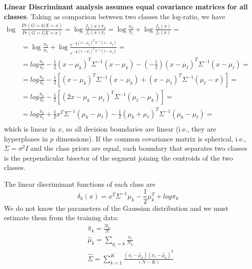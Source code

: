 \documentclass[12pt, letterpaper]{article}
\theoremstyle{definition}
\begin{document}
\textbf{Linear Discriminant analysis assumes equal covariance matrices for all classes}. Taking as comparison between two classes the log-ratio, we have
\begin{equation}
\begin{aligned}
\log &\frac{Pr(G=k|X=x)}{Pr(G=l|X=x)} = \log \frac{f_k(x) \pi_k}{f_\ell(x) \pi_\ell} = \log \frac{ \pi_k}{ \pi_\ell} + \log\frac{f_k(x)}{f_\ell(x) } =\\
&= \log \frac{ \pi_k}{ \pi_\ell} + \log\frac{e^{-\frac{1}{2}\left( x-\mu_k\right)^T\Sigma^{-1}\left( x-\mu_k\right)}}{e^{-\frac{1}{2}\left( x-\mu_\ell\right)^T\Sigma^{-1}\left( x-\mu_\ell\right)} }   =  \\
&=log \frac{ \pi_k}{ \pi_\ell} - \frac{1}{2}\left( x-\mu_k\right)^T\Sigma^{-1}\left( x-\mu_k\right) - \left( -\frac{1}{2}\right)\left( x-\mu_\ell\right)^T\Sigma^{-1}\left( x-\mu_\ell\right) =\\
&= log \frac{ \pi_k}{ \pi_\ell} - \frac{1}{2}\left[\left( x-\mu_k\right)^T\Sigma^{-1}\left( x-\mu_k\right) + \left( x-\mu_\ell\right)^T\Sigma^{-1}\left( \mu_\ell - x\right)\right] =\\
&= log \frac{ \pi_k}{ \pi_\ell} - \frac{1}{2}\left[\left( 2x-\mu_k-\mu_\ell\right)^T\Sigma^{-1}\left( \mu_\ell-\mu_k\right) \right] =\\
&= log \frac{ \pi_k}{ \pi_\ell} +\frac{1}{2}x^T\Sigma^{-1}\left( \mu_k-\mu_\ell\right)- \frac{1}{2}\left( \mu_k+\mu_\ell\right)^T\Sigma^{-1}\left( \mu_k-\mu_\ell\right) =\\
\end{aligned}
\end{equation}
which is linear in $x$, so all decision boundaries are linear (i.e., they are hyperplanes in $p$ dimensions). If the common covariance matrix is spherical, i.e., $\Sigma=\sigma^2 I$ and the class priors are equal, each boundary that separates two classes is the perpendicular bisector of the segment joining the centroids of the two classes.

The linear discriminant functions of each class are 
\begin{equation}
\delta_k(x)  = x^T \Sigma^{-1}\mu_k -\frac{1}{2}\mu_k^T+log\pi_k
\end{equation}
We do not know the parameters of the Gaussian distribution and we must estimate them from the training data:
\begin{align}
&\hat{\pi}_k = \frac{N_k}{N}\\
&\hat{\mu}_k = \sum_{g_i=k}\frac{x_i}{N_k}\\
&\hat{\Sigma} = \sum_{k=1}^K\frac{(x_i-\hat{\mu}_k)(x_i-\hat{\mu}_k)^T}{(N-K)}
\end{align}
\end{document}
